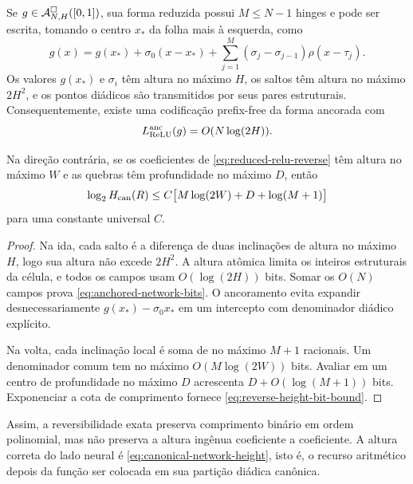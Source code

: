 \begin{proposition}
\label{prop:anchored-relu-code}
Se $g\in\mathcal{A}^\square_{N,H}([0,1])$, sua forma reduzida possui
$M\le N-1$ hinges e pode ser escrita, tomando o centro $x_*$ da folha mais à
esquerda, como
\begin{equation}
 g(x)=g(x_*)+\sigma_0(x-x_*)
      +\sum_{j=1}^{M}(\sigma_j-\sigma_{j-1})\rho(x-\tau_j).
 \label{eq:anchored-relu-form}
\end{equation}
Os valores $g(x_*)$ e $\sigma_i$ têm altura no máximo $H$, os saltos têm
altura no máximo $2H^2$, e os pontos diádicos são transmitidos por seus pares
estruturais. Consequentemente, existe uma codificação prefix-free da forma
ancorada com
\begin{equation}
 L_{\rm ReLU}^{\rm anc}(g)=O(N\log(2H)).
 \label{eq:anchored-network-bits}
\end{equation}

Na direção contrária, se os coeficientes de
\eqref{eq:reduced-relu-reverse} têm altura no máximo $W$ e as quebras têm
profundidade no máximo $D$, então
\begin{equation}
 \log_2 H_{\rm can}(R)
 \le C\bigl[M\log(2W)+D+\log(M+1)\bigr]
 \label{eq:reverse-height-bit-bound}
\end{equation}
para uma constante universal $C$.
\end{proposition}

\begin{proof}
Na ida, cada salto é a diferença de duas inclinações de altura no máximo
$H$, logo sua altura não excede $2H^2$. A altura atômica limita os inteiros
estruturais da célula, e todos os campos usam $O(\log(2H))$ bits. Somar os
$O(N)$ campos prova \eqref{eq:anchored-network-bits}. O ancoramento evita
expandir desnecessariamente $g(x_*)-\sigma_0x_*$ em um intercepto com
denominador diádico explícito.

Na volta, cada inclinação local é soma de no máximo $M+1$ racionais. Um
denominador comum tem no máximo $O(M\log(2W))$ bits. Avaliar em um centro de
profundidade no máximo $D$ acrescenta $D+O(\log(M+1))$ bits. Exponenciar a
cota de comprimento fornece \eqref{eq:reverse-height-bit-bound}.
\end{proof}

Assim, a reversibilidade exata preserva comprimento binário em ordem
polinomial, mas não preserva a altura ingênua coeficiente a coeficiente. A
altura correta do lado neural é \eqref{eq:canonical-network-height}, isto é,
o recurso aritmético depois da função ser colocada em sua partição diádica
canônica.

